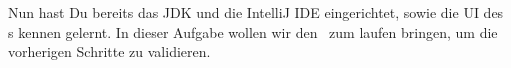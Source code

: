 

Nun hast Du bereits das JDK und die IntelliJ IDE eingerichtet, sowie die UI des \simulator s kennen gelernt.
In dieser Aufgabe wollen wir den \simulator~zum laufen bringen, um die vorherigen Schritte zu validieren.

\addexcercise

